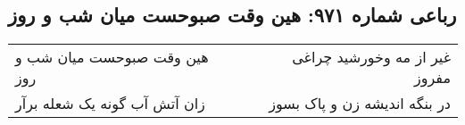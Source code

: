 \begin{center}
\section*{رباعی شماره ۹۷۱: هین وقت صبوحست میان شب و روز}
\label{sec:0971}
\begin{longtable}{l p{0.5cm} r}
هین وقت صبوحست میان شب و روز
&&
غیر از مه وخورشید چراغی مفروز
\\
زان آتش آب گونه یک شعله برآر
&&
در بنگه اندیشه زن و پاک بسوز
\\
\end{longtable}
\end{center}
